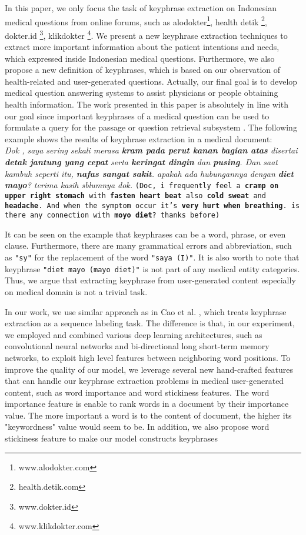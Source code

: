 \documentclass[sigconf]{acmart}
\begin{document}
In this paper, we only focus the task of keyphrase extraction on Indonesian medical questions from online forums, such as alodokter\footnote{www.alodokter.com}, health detik \footnote{health.detik.com}, dokter.id \footnote{www.dokter.id}, klikdokter \footnote{www.klikdokter.com}. We present a new keyphrase extraction techniques to extract more important information about the patient intentions and needs, which expressed inside Indonesian medical questions. Furthermore, we also propose a new definition of keyphrases, which is based on our observation of health-related and user-generated questions. Actually, our final goal is to develop medical question answering systems to assist physicians or people obtaining health information. The work presented in this paper is absolutely in line with our goal since important keyphrases of a medical question can be used to formulate a query for the passage or question retrieval subsystem \cite{gong2009improving}. The following example shows the results of keyphrase extraction in a medical document:
	\textit{\\Dok , saya sering sekali merasa \textbf{\emph{kram pada perut kanan bagian atas}} disertai \textbf{detak jantung yang cepat} serta \textbf{keringat dingin} dan \textbf{pusing}. Dan saat kambuh seperti itu, \textbf{nafas sangat sakit}. apakah ada hubungannya dengan \textbf{diet mayo}? terima kasih sblumnya dok.}
	\texttt{(Doc, i frequently feel a \textbf{cramp on upper right stomach} with \textbf{fasten heart beat} also \textbf{cold sweat} and \textbf{headache}. And when the symptom occur it's \textbf{very hurt when breathing}. is there any connection with \textbf{moyo diet}? thanks before)}
	
It can be seen on the example that keyphrases can be a word, phrase, or even clause. Furthermore, there are many grammatical errors and abbreviation, such as \texttt{"sy"} for the replacement of the word \texttt{"saya (I)"}. It is also worth to note that keyphrase \texttt{"diet mayo (mayo diet)"} is not part of any medical entity categories. Thus, we argue that extracting keyphrase from user-generated content especially on medical domain is not a trivial task. 

In our work, we use similar approach as in Cao et al. \cite{cao2010automatically}, which treats keyphrase extraction as a sequence labeling task. The difference is that, in our experiment, we employed and combined various deep learning architectures, such as convolutional neural networks and bi-directional long short-term memory networks, to exploit high level features between neighboring word positions. To improve the quality of our model, we leverage several new hand-crafted features that can handle our keyphrase extraction problems in medical user-generated content, such as word importance and word stickiness features. The word importance feature is enable to rank words in a document by their importance value. The more important a word is to the content of document, the higher its "keywordness" value would seem to be. In addition, we also propose word stickiness feature to make our model constructs keyphrases
\end{document}
